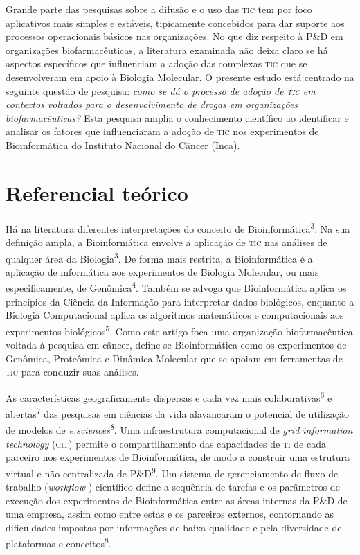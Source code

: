 \documentclass{article}
\begin{document}
Grande parte das pesquisas sobre a difusão e o uso das \textsc{tic} tem por foco
aplicativos mais simples e estáveis, tipicamente concebidos para dar suporte aos
processos operacionais básicos nas organizações. No que diz respeito à P\&D em
organizações biofarmacêuticas, a literatura examinada não deixa claro se há
aspectos específicos que influenciam a adoção das complexas \textsc{tic} que se
desenvolveram em apoio à Biologia Molecular. O presente estudo está centrado na
seguinte questão de pesquisa: \textit{como se dá o processo de adoção de \textsc{tic} em
contextos voltados para o desenvolvimento de drogas em organizações
biofarmacêuticas?}
Esta pesquisa amplia o conhecimento científico ao identificar e analisar os
fatores que influenciaram a adoção de \textsc{tic} nos experimentos de Bioinformática do
Instituto Nacional do Câncer (Inca).

\section{Referencial teórico}

Há na literatura diferentes interpretações do conceito de
Bioinformática\textsuperscript{3}. Na sua definição ampla, a Bioinformática envolve a aplicação de \textsc{tic} nas
análises de qualquer área da Biologia\textsuperscript{3}. De forma mais restrita, a Bioinformática é a aplicação de informática aos
experimentos de Biologia Molecular, ou mais especificamente, de
Genômica\textsuperscript{4}. Também se advoga que Bioinformática aplica os princípios da Ciência da
Informação para interpretar dados biológicos, enquanto a Biologia Computacional
aplica os algoritmos matemáticos e computacionais aos experimentos
biológicos\textsuperscript{5}. Como este artigo foca uma organização biofarmacêutica voltada à pesquisa em
câncer, define-se Bioinformática como os experimentos de Genômica, Proteômica e
Dinâmica Molecular que se apoiam em ferramentas de \textsc{tic} para conduzir suas
análises.

As características geograficamente dispersas e cada vez mais
colaborativas\textsuperscript{6}
e abertas\textsuperscript{7}
das pesquisas em ciências da vida alavancaram o potencial de utilização de
modelos de \textit{e.sciences\textsuperscript{8}}. Uma infraestrutura computacional de \textit{grid information technology}
(\textsc{git}) permite o compartilhamento das capacidades de \textsc{ti} de cada parceiro nos
experimentos de Bioinformática, de modo a construir uma estrutura virtual e não
centralizada de P\&D\textsuperscript{9}. Um sistema de gerenciamento de fluxo de trabalho (\textit{workflow}
) científico define a sequência de tarefas e os parâmetros de execução dos
experimentos de Bioinformática entre as áreas internas da P\&D de uma empresa,
assim como entre estas e os parceiros externos, contornando as dificuldades
impostas por informações de baixa qualidade e pela diversidade de plataformas e
conceitos\textsuperscript{8}.
\end{document}
